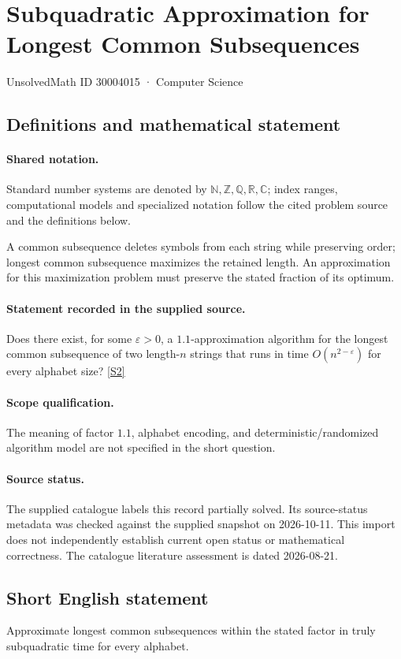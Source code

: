 \documentclass[11pt]{article}
\newcommand{\sref}[2]{\hyperlink{source:#1:#2}{[S#2]}}
\begin{document}
\setcounter{section}{30004014}
\section{Subquadratic Approximation for Longest Common Subsequences}\label{30004015}
{\small\sffamily UnsolvedMath ID 30004015 · Computer Science}
\subsection{Definitions and mathematical statement}

\paragraph{Shared notation.}Standard number systems are denoted by $\mathbb N,\mathbb Z,\mathbb Q,\mathbb R,\mathbb C$; index ranges, computational models and specialized notation follow the cited problem source and the definitions below.


A common subsequence deletes symbols from each string while preserving order; longest common subsequence maximizes the retained length. An approximation for this maximization problem must preserve the stated fraction of its optimum.
\paragraph{Statement recorded in the supplied source.}
Does there exist, for some $\varepsilon>0$, a $1.1$-approximation algorithm for the longest common subsequence of two length-$n$ strings that runs in time $O(n^{2-\varepsilon})$ for every alphabet size? \sref{30004015}{2}
\paragraph{Scope qualification.}
The meaning of factor $1.1$, alphabet encoding, and deterministic/randomized algorithm model are not specified in the short question.
\paragraph{Source status.}
The supplied catalogue labels this record partially solved. Its source-status metadata was checked against the supplied snapshot on 2026-10-11. This import does not independently establish current open status or mathematical correctness. The catalogue literature assessment is dated 2026-08-21.
\subsection{Short English statement}
Approximate longest common subsequences within the stated factor in truly subquadratic time for every alphabet.
\end{document}
